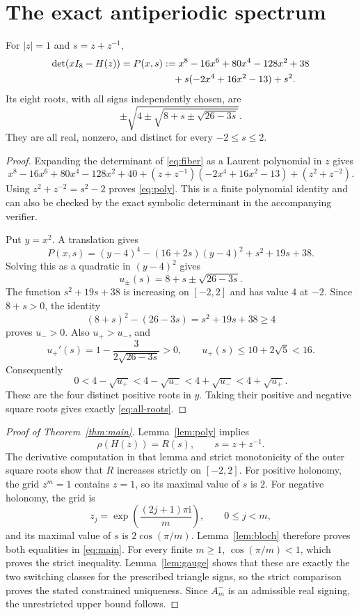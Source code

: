 \section{The exact antiperiodic spectrum}

\begin{lemma}\label{lem:poly}
For $|z|=1$ and $s=z+z^{-1}$,
\begin{align}
 \det(xI_8-H(z))=P(x,s)
  &:=x^8-16x^6+80x^4-128x^2+38 \notag\\
  &\quad+s(-2x^4+16x^2-13)+s^2.
 \label{eq:poly}
\end{align}
Its eight roots, with all signs independently chosen, are
\begin{equation}
 \pm\sqrt{4\pm\sqrt{8+s\pm\sqrt{26-3s}}}.
 \label{eq:all-roots}
\end{equation}
They are all real, nonzero, and distinct for every $-2\le s\le2$.
\end{lemma}
\begin{proof}
Expanding the determinant of \eqref{eq:fiber} as a Laurent polynomial
in $z$ gives
\[
 x^8-16x^6+80x^4-128x^2+40
 +(z+z^{-1})(-2x^4+16x^2-13)+(z^2+z^{-2}).
\]
Using $z^2+z^{-2}=s^2-2$ proves \eqref{eq:poly}.
This is a finite polynomial identity and can also be checked by the exact
symbolic determinant in the accompanying verifier.

Put $y=x^2$. A translation gives
\begin{equation}
 P(x,s)=(y-4)^4-(16+2s)(y-4)^2+s^2+19s+38.
 \label{eq:centered}
\end{equation}
Solving this as a quadratic in $(y-4)^2$ gives
\[
 u_\pm(s)=8+s\pm\sqrt{26-3s}.
\]
The function $s^2+19s+38$ is increasing on $[-2,2]$ and has value $4$
at $-2$. Since $8+s>0$, the identity
\[
 (8+s)^2-(26-3s)=s^2+19s+38\ge4
\]
proves $u_->0$. Also $u_+>u_-$, and
\[
 u_+'(s)=1-\frac3{2\sqrt{26-3s}}>0,
 \qquad u_+(s)\le10+2\sqrt5<16.
\]
Consequently
\[
 0<4-\sqrt{u_+}<4-\sqrt{u_-}
   <4+\sqrt{u_-}<4+\sqrt{u_+}.
\]
These are the four distinct positive roots in $y$. Taking their positive
and negative square roots gives exactly \eqref{eq:all-roots}.
\end{proof}

\begin{proof}[Proof of Theorem~\ref{thm:main}]
Lemma~\ref{lem:poly} implies
\[
 \rho(H(z))=R(s),\qquad s=z+z^{-1}.
\]
The derivative computation in that lemma and strict monotonicity of the
outer square roots show that $R$ increases strictly on $[-2,2]$.
For positive holonomy, the grid $z^m=1$ contains $z=1$, so its maximal
value of $s$ is $2$. For negative holonomy, the grid is
\[
 z_j=\exp\!\left(\frac{(2j+1)\pi\mathrm i}{m}\right),
 \qquad 0\le j<m,
\]
and its maximal value of $s$ is $2\cos(\pi/m)$. Lemma~\ref{lem:bloch}
therefore proves both equalities in \eqref{eq:main}.
For every finite $m\ge1$, $\cos(\pi/m)<1$, which proves the strict
inequality. Lemma~\ref{lem:gauge} shows that these are exactly the two
switching classes for the prescribed triangle signs, so the strict
comparison proves the stated constrained uniqueness. Since $A_m^-$ is
an admissible real signing, the unrestricted upper bound follows.
\end{proof}


